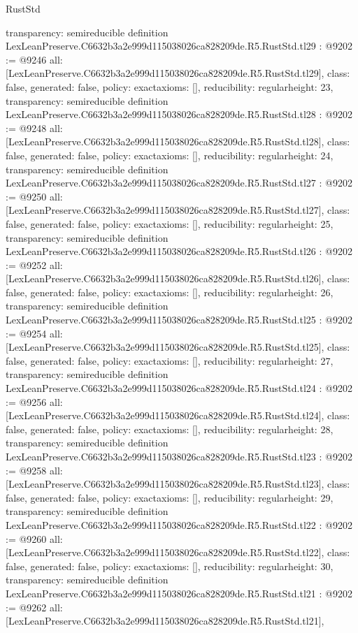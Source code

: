 \begin{lexlean}{RustStd}
\begin{coremodule}
{  transparency: semireducible
}
definition LexLeanPreserve.C6632b3a2e999d115038026ca828209de.R5.RustStd.tl29 : @9202 := @9246 {
  all: [LexLeanPreserve.C6632b3a2e999d115038026ca828209de.R5.RustStd.tl29],
  class: false,
  generated: false,
  policy: exact{axioms: []},
  reducibility: regular{height: 23},
  transparency: semireducible
}
definition LexLeanPreserve.C6632b3a2e999d115038026ca828209de.R5.RustStd.tl28 : @9202 := @9248 {
  all: [LexLeanPreserve.C6632b3a2e999d115038026ca828209de.R5.RustStd.tl28],
  class: false,
  generated: false,
  policy: exact{axioms: []},
  reducibility: regular{height: 24},
  transparency: semireducible
}
definition LexLeanPreserve.C6632b3a2e999d115038026ca828209de.R5.RustStd.tl27 : @9202 := @9250 {
  all: [LexLeanPreserve.C6632b3a2e999d115038026ca828209de.R5.RustStd.tl27],
  class: false,
  generated: false,
  policy: exact{axioms: []},
  reducibility: regular{height: 25},
  transparency: semireducible
}
definition LexLeanPreserve.C6632b3a2e999d115038026ca828209de.R5.RustStd.tl26 : @9202 := @9252 {
  all: [LexLeanPreserve.C6632b3a2e999d115038026ca828209de.R5.RustStd.tl26],
  class: false,
  generated: false,
  policy: exact{axioms: []},
  reducibility: regular{height: 26},
  transparency: semireducible
}
definition LexLeanPreserve.C6632b3a2e999d115038026ca828209de.R5.RustStd.tl25 : @9202 := @9254 {
  all: [LexLeanPreserve.C6632b3a2e999d115038026ca828209de.R5.RustStd.tl25],
  class: false,
  generated: false,
  policy: exact{axioms: []},
  reducibility: regular{height: 27},
  transparency: semireducible
}
definition LexLeanPreserve.C6632b3a2e999d115038026ca828209de.R5.RustStd.tl24 : @9202 := @9256 {
  all: [LexLeanPreserve.C6632b3a2e999d115038026ca828209de.R5.RustStd.tl24],
  class: false,
  generated: false,
  policy: exact{axioms: []},
  reducibility: regular{height: 28},
  transparency: semireducible
}
definition LexLeanPreserve.C6632b3a2e999d115038026ca828209de.R5.RustStd.tl23 : @9202 := @9258 {
  all: [LexLeanPreserve.C6632b3a2e999d115038026ca828209de.R5.RustStd.tl23],
  class: false,
  generated: false,
  policy: exact{axioms: []},
  reducibility: regular{height: 29},
  transparency: semireducible
}
definition LexLeanPreserve.C6632b3a2e999d115038026ca828209de.R5.RustStd.tl22 : @9202 := @9260 {
  all: [LexLeanPreserve.C6632b3a2e999d115038026ca828209de.R5.RustStd.tl22],
  class: false,
  generated: false,
  policy: exact{axioms: []},
  reducibility: regular{height: 30},
  transparency: semireducible
}
definition LexLeanPreserve.C6632b3a2e999d115038026ca828209de.R5.RustStd.tl21 : @9202 := @9262 {
  all: [LexLeanPreserve.C6632b3a2e999d115038026ca828209de.R5.RustStd.tl21],
}
\end{coremodule}
\end{lexlean}
